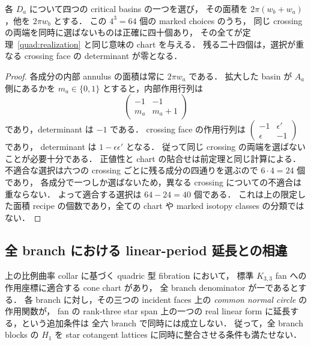 \begin{corollary}\label{quad:forty}
各 $D_a$ について四つの critical basins の一つを選び，
その面積を $2\pi(w_b+w_a)$，他を $2\pi w_b$ とする．
この $4^3=64$ 個の marked choices のうち，
同じ crossing の両端を同時に選ばないものは正確に四十個あり，
その全てが定理~\ref{quad:realization} と同じ意味の chart を与える．
残る二十四個は，選択が重なる crossing face の determinant が零となる．
\end{corollary}

\begin{proof}
各成分の内部 annulus の面積は常に $2\pi w_a$ である．
拡大した basin が $A_a$ 側にあるかを $m_a\in\{0,1\}$ とすると，内部作用行列は
\[
 \begin{pmatrix}-1&-1\\m_a&m_a+1\end{pmatrix}
\]
であり，determinant は $-1$ である．
crossing face の作用行列は
$\left(\begin{smallmatrix}-1&\epsilon'\\\epsilon&-1\end{smallmatrix}\right)$ であり，
determinant は $1-\epsilon\epsilon'$ となる．
従って同じ crossing の両端を選ばないことが必要十分である．
正値性と chart の貼合せは前定理と同じ計算による．
不適合な選択は六つの crossing ごとに残る成分の四通りを選ぶので $6\cdot4=24$ 個であり，
各成分で一つしか選ばないため，異なる crossing についての不適合は重ならない．
よって適合する選択は $64-24=40$ 個である．
これは上の限定した面積 recipe の個数であり，全ての chart や marked isotopy classes の分類ではない．
\end{proof}

\subsection{全 branch における linear-period 延長との相違}

\begin{proposition}\label{quad:strong-obstruction}
上の比例曲率 collar に基づく quadric 型 fibration において，
標準 $K_{3,3}$ fan への作用座標に適合する cone chart があり，
全 branch denominator が一であるとする．
各 branch に対し，その三つの incident faces 上の \emph{common normal circle} の作用関数が，
fan の rank-three star span 上の一つの real linear form に延長する，という追加条件は
全六 branch で同時には成立しない．
従って，全 branch blocks の $H_1$ を star cotangent lattices に同時に整合させる条件も満たせない．
\end{proposition}

